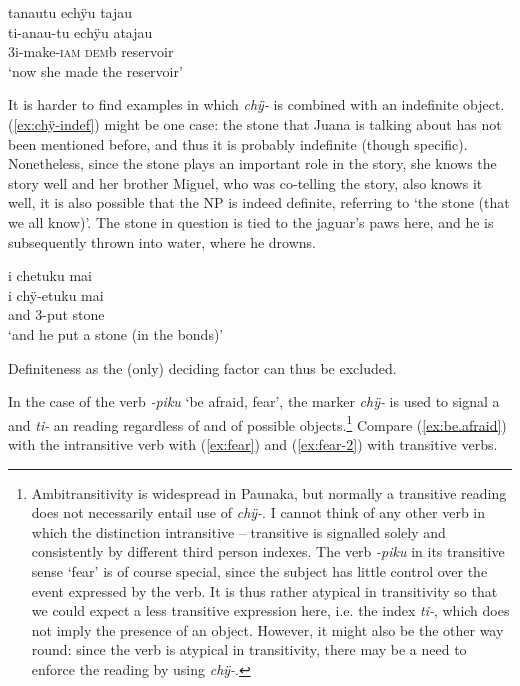 \ea\label{ex:ti-DEF-2}
\begingl 
\glpreamble tanautu echÿu tajau\\
\gla ti-anau-tu echÿu atajau\\ 
\glb 3i-make-\textsc{iam} \textsc{dem}b reservoir\\ 
\glft ‘now she made the reservoir’
\trailingcitation{[jxx-p120515l-2.083]}
\xe

It is harder to find examples in which \textit{chÿ-} is combined with an indefinite object. (\ref{ex:chÿ-indef}) might be one case: the stone that Juana is talking about has not been mentioned before, and thus it is probably indefinite (though specific). Nonetheless, since the stone plays an important role in the story, she knows the story well and her brother Miguel, who was co-telling the story, also knows it well, it is also possible that the NP is indeed definite, referring to ‘the stone (that we all know)’. The stone in question is tied to the jaguar’s paws here, and he is subsequently thrown into water, where he drowns.

\ea\label{ex:chÿ-indef}
\begingl
\glpreamble i chetuku mai\\
\gla i chÿ-etuku mai\\
\glb and 3-put stone\\
\glft ‘and he put a stone (in the bonds)’
\endgl
\trailingcitation{[jmx-n120429ls-x5.259]}
\xe

Definiteness as the (only) deciding factor can thus be excluded. 

In the case of the verb \textit{-piku} ‘be afraid, fear’, the marker \textit{chÿ-} is used to signal a  and \textit{ti-} an  reading regardless of  and  of possible objects.\footnote{Ambitransitivity is widespread in Paunaka, but normally a transitive reading does not necessarily entail use of \textit{chÿ-}. I cannot think of any other verb in which the distinction intransitive – transitive is signalled solely and consistently by different third person indexes. The verb \textit{-piku} in its transitive sense ‘fear’ is of course special, since the subject has little control over the event expressed by the verb. It is thus rather atypical in transitivity \citep[cf.][252]{HopperThompson1980} so that we could expect a less transitive expression here, i.e. the index \textit{ti-}, which does not imply the presence of an object. However, it might also be the other way round: since the verb is atypical in transitivity, there may be a need to enforce the  reading by using \textit{chÿ-}.} Compare (\ref{ex:be.afraid}) with the intransitive verb with (\ref{ex:fear}) and (\ref{ex:fear-2}) with transitive verbs.

